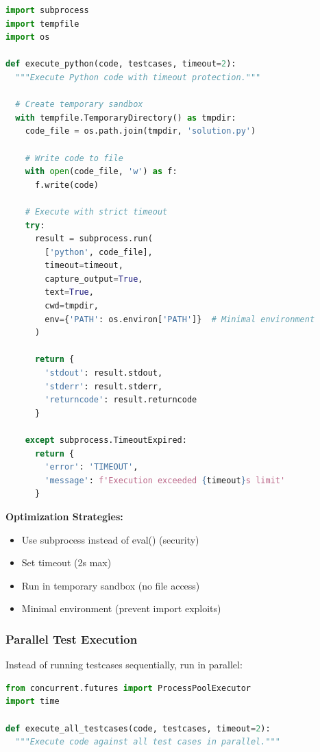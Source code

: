 \documentclass[12pt,a4paper,oneside]{article}
\begin{document}
{{\begin{lstlisting}[language=Python, caption=Python Code Executor Optimization]
import subprocess
import tempfile
import os

def execute_python(code, testcases, timeout=2):
  """Execute Python code with timeout protection."""
  
  # Create temporary sandbox
  with tempfile.TemporaryDirectory() as tmpdir:
    code_file = os.path.join(tmpdir, 'solution.py')
    
    # Write code to file
    with open(code_file, 'w') as f:
      f.write(code)
    
    # Execute with strict timeout
    try:
      result = subprocess.run(
        ['python', code_file],
        timeout=timeout,
        capture_output=True,
        text=True,
        cwd=tmpdir,
        env={'PATH': os.environ['PATH']}  # Minimal environment
      )
      
      return {
        'stdout': result.stdout,
        'stderr': result.stderr,
        'returncode': result.returncode
      }
      
    except subprocess.TimeoutExpired:
      return {
        'error': 'TIMEOUT',
        'message': f'Execution exceeded {timeout}s limit'
      }
\end{lstlisting}

\textbf{Optimization Strategies:}

\begin{itemize}
    \item Use subprocess instead of eval() (security)
    \item Set timeout (2s max)
    \item Run in temporary sandbox (no file access)
    \item Minimal environment (prevent import exploits)
\end{itemize}

\subsubsection{Parallel Test Execution}

Instead of running testcases sequentially, run in parallel:

\begin{lstlisting}[language=Python, caption=Parallel Test Execution]
from concurrent.futures import ProcessPoolExecutor
import time

def execute_all_testcases(code, testcases, timeout=2):
  """Execute code against all test cases in parallel."""
  

\end{lstlisting}}}
\end{document}
